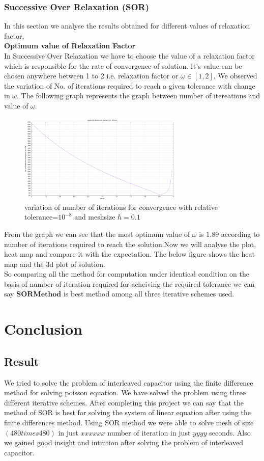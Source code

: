 \subsubsection{Successive Over Relaxation (SOR)}
In this section we analyse the results obtained for different values of relaxation factor.\\[2mm]
\noindent
\textbf{ Optimum value of Relaxation Factor } \\
In Successive Over Relaxation we have to choose the value of a relaxation factor which is responsible for the rate of convergence of solution. It's value can be chosen anywhere between 1 to 2 i.e. relaxation factor or $\omega  \in [1,2]$. We observed the variation of No. of iterations required to reach a given tolerance with change in $ \omega $. The following graph represents the graph between number of itereations and value of $\omega$. \\
\begin{figure}[h]
    \centering
    \includegraphics[width=0.7\textwidth]{content/graphs/omega.png}
    \caption{variation of number of iterations for convergence with relative tolerance=$10^{-8}$ and meshsize $h = 0.1$  }
    \label{omega variation}
\end{figure}
From the graph we can see that the most optimum value of $ \omega $ is $1.89$ according to number of iterations required to reach the solution.Now we will analyse the plot, heat map and  compare it with the expectation. The below figure shows the heat map and the 3d plot of solution. \\

So comparing all the method for computation under identical condition on the basis of number of iteration required for acheiving the required tolerance we can say $ \boldsymbol{SOR Method} $ is best method among all three iterative schemes used.
\newpage
\section{Conclusion}
\subsection{Result}
We tried to solve the problem of interleaved capacitor using the finite difference method for solving poisson equation. We have solved the problem using three different iterative schemes. After completing this project we can say that the method of SOR is best for solving the system of linear equation after using the finite differences method. Using SOR method we were able to solve mesh of size $ (480 times 480) $ in just $ xxxxxx $ number of iteration in just $  yyyy $ seconds. Also we gained good insight and intuition after solving the problem of interleaved capacitor.
